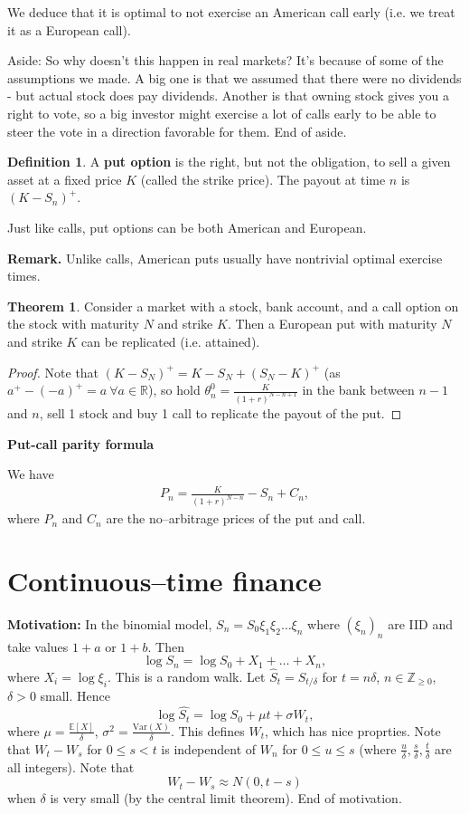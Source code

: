 \documentclass{article}
\theoremstyle{definition}
\newtheorem{theorem}{Theorem}[section]
\newtheorem{defn}{Definition}[section]
\begin{document}
We deduce that it is optimal to not exercise an American call early (i.e. we treat it as a European call).
\vspace{1mm}

Aside: So why doesn't this happen in real markets? It's because of some of the assumptions we made. A big one is that we assumed that there were no dividends - but actual stock does pay dividends. Another is that owning stock gives you a right to vote, so a big investor might exercise a lot of calls early to be able to steer the vote in a direction favorable for them. End of aside.

\begin{defn}
    A \textbf{put option} is the right, but not the obligation, to sell a given asset at a fixed price $K$ (called the strike price). The payout at time $n$ is $(K-S_n)^+$.
\end{defn}
Just like calls, put options can be both American and European.
\vspace{1mm}

\textbf{Remark.} Unlike calls, American puts usually have nontrivial optimal exercise times.
\begin{theorem}
    Consider a market with a stock, bank account, and a call option on the stock with maturity $N$ and strike $K$. Then a European put with maturity $N$ and strike $K$ can be replicated (i.e. attained).
\end{theorem}
\begin{proof}
    Note that $(K-S_N)^+ = K-S_N + (S_N-K)^+$ (as $a^+ - (-a)^+ =a ~\forall a \in \mathbb{R}$), so hold $\theta_n^0 = \frac{K}{(1+r)^{N-n+1}}$ in the bank between $n-1$ and $n$, sell 1 stock and buy 1 call to replicate the payout of the put.
\end{proof}
\vspace{1mm}

\textbf{Put-call parity formula}

We have 
\begin{align*}
    P_n = \frac{K}{(1+r)^{N-n}} - S_n + C_n,
\end{align*}
where $P_n$ and $C_n$ are the no--arbitrage prices of the put and call.


\section{Continuous--time finance}
\textbf{Motivation:} In the binomial model, $S_n=S_0\xi_1\xi_2\ldots \xi_n$ where $(\xi_n)_n$ are IID and take values $1+a$ or $1+b$. Then \[
\log S_n = \log S_0 + X_1 + \ldots + X_n,
\]
where $X_i = \log \xi_i$. This is a random walk. Let $\hat{S}_t = S_{t/\delta}$ for $t=n \delta$, $n \in \mathbb{Z}_{\ge 0}$, $\delta>0$ small. Hence \[
\log \hat{S_t} = \log S_0 + \mu t + \sigma W_t, 
\] 
where $\mu = \frac{\mathbb{E}[X]}{\delta}$, $\sigma^2 = \frac{\text{Var}(X)}{\delta}$. This defines $W_t$, which has nice proprties. Note that $W_t-W_s$ for $0\le s<t$
is independent of $W_n$ for $0\le u\le s$ (where $\frac{u}{\delta},\frac{s}{\delta},\frac{t}{\delta}$ are all integers). Note that \[
W_t-W_s \approx N(0,t-s)
\]
when $\delta$ is very small (by the central limit theorem). End of motivation.
\vspace{1mm}
\end{document}
